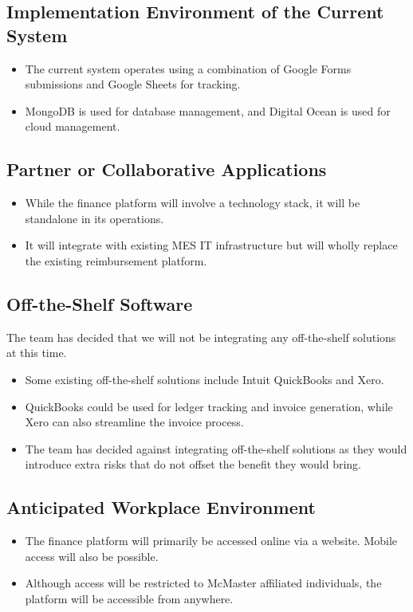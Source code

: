 \documentclass[12pt]{article}
\begin{document}
\subsection{Implementation Environment of the Current System}
\begin{itemize}
    \item The current system operates using a combination of Google Forms submissions and Google Sheets for tracking. 
    \item MongoDB is used for database management, and Digital Ocean is used for cloud management.
\end{itemize}

\subsection{Partner or Collaborative Applications}
\begin{itemize}
    \item While the finance platform will involve a technology stack, it will be standalone in its operations.
    \item It will integrate with existing MES IT infrastructure but will wholly replace the existing reimbursement platform.
\end{itemize}
 

\subsection{Off-the-Shelf Software}
The team has decided that we will not be integrating any off-the-shelf solutions at this time.

\begin{itemize}
    \item Some existing off-the-shelf solutions include Intuit QuickBooks and Xero.
    \item QuickBooks could be used for ledger tracking and invoice generation, while Xero can also streamline the invoice process.
    \item The team has decided against integrating off-the-shelf solutions as they would introduce extra risks that do not offset the benefit they would bring. 
\end{itemize}
 
\subsection{Anticipated Workplace Environment}
\begin{itemize}
    \item The finance platform will primarily be accessed online via a website. Mobile access will also be possible. 
    \item Although access will be restricted to McMaster affiliated individuals, the platform will be accessible from anywhere.
\end{itemize}
 
\end{document}
